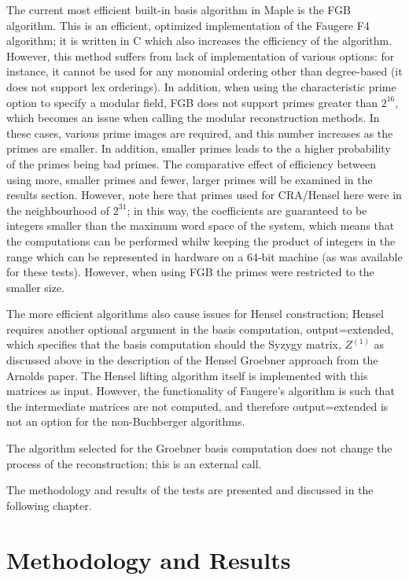 \documentclass[letterpaper,12pt,titlepage,oneside,final]{book}
\begin{document}
The current most efficient built-in basis algorithm in Maple is the FGB algorithm.  This is an efficient, optimized implementation of the Faugere F4 algorithm; it is written in C which also increases the efficiency of the algorithm.  However, this method suffers from lack of implementation of various options: for instance, it cannot be used for any monomial ordering other than degree-based (it does not support lex orderings).  In addition, when using the characteristic prime option to specify a modular field, FGB does not support primes greater than ${2^{16}}$, which becomes an issue when calling the modular reconstruction methods.  In these cases, various prime images are required, and this number increases as the primes are smaller.  In addition, smaller primes leads to the a higher probability of the primes being bad primes.  The comparative effect of efficiency between using more, smaller primes and fewer, larger primes will be examined in the results section.  However, note here that primes used for CRA/Hensel here were in the neighbourhood of ${2^{31}}$; in this way, the coefficients are guaranteed to be integers smaller than the maximum word space of the system, which means that the computations can be performed whilw keeping the product of integers in the range which can be represented in hardware on a 64-bit machine (as was available for these tests).  However, when using FGB the primes were restricted to the smaller size.

The more efficient algorithms also cause issues for Hensel construction; Hensel requires another optional argument in the basis computation, output=extended, which specifies that the basis computation should the Syzygy matrix, ${Z^{(1)}}$ as discussed above in the description of the Hensel Groebner approach from the Arnolds paper.  The Hensel lifting algorithm itself is implemented with this matrices as input.  However, the functionality of Faugere's algorithm is such that the intermediate matrices are not computed, and therefore output=extended is not an option for the non-Buchberger algorithms.  

The algorithm selected for the Groebner basis computation does not change the process of the reconstruction; this is an external call.



The methodology and results of the tests are presented and discussed in the following chapter.

\chapter{Methodology and Results}
\end{document}
